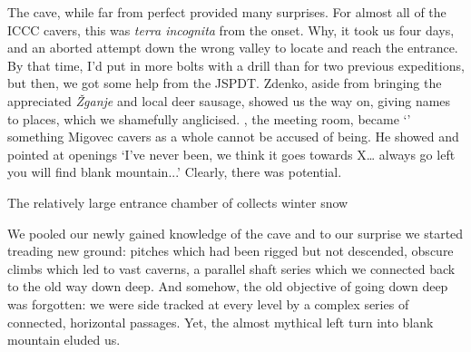 The cave, while far from perfect provided many surprises. For almost all of the ICCC cavers, this was \textsl{terra incognita}  from the onset. Why, it took us four days, and an aborted attempt down the wrong valley to locate and reach the entrance. By that time, I'd put in more bolts with a drill than for two previous expeditions, but then, we got some help from the JSPDT. Zdenko, aside from bringing the appreciated \emph{\v{Z}ganje}  and local deer sausage, showed us the way on, giving names to places, which we shamefully anglicised. , the meeting room, became `' something Migovec cavers as a whole cannot be accused of being. He showed and pointed at openings `I've never been, we think it goes towards X… always go left you will find blank mountain...' Clearly, there was potential.


\begin{marginfigure}

	\checkoddpage \ifoddpage \forcerectofloat \else \forceversofloat \fi
	\centering
  	\caption{The relatively large entrance chamber of \protect{} collects winter snow }
	\end{marginfigure}

We pooled our newly gained knowledge of the cave and to our surprise we started treading new ground: pitches which had been rigged but not descended, obscure climbs which led to vast caverns, a parallel shaft series which we connected back to the old way down deep. And somehow, the old objective of going down deep was forgotten: we were side tracked at every level by a complex series of connected, horizontal passages. Yet, the almost mythical left turn into blank mountain eluded us.

